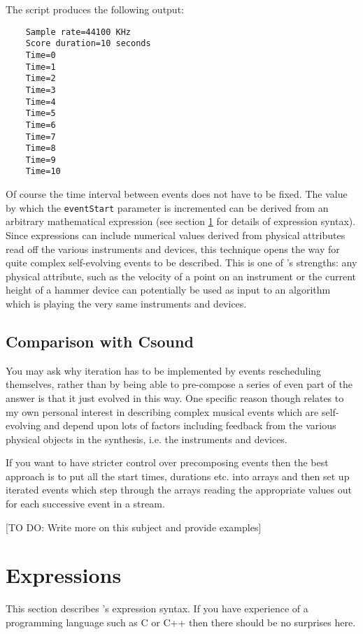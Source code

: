 The script produces the following output:

\begin{verbatim}
    Sample rate=44100 KHz
    Score duration=10 seconds
    Time=0
    Time=1
    Time=2
    Time=3
    Time=4
    Time=5
    Time=6
    Time=7
    Time=8
    Time=9
    Time=10
\end{verbatim}

Of course the time interval between events does not have to be fixed.
The value by which the \verb|eventStart| parameter is incremented
can be derived from an arbitrary mathematical expression (see
section \ref{section:expressions} for details of expression syntax).
Since expressions can include numerical values derived from physical
attributes read off the various instruments and devices, this technique
opens the way for quite complex self-evolving events to be described.
This is one of \tao's strengths: any physical attribute, such as the
velocity of a point on an instrument or the current height of a hammer
device can potentially be used as input to an algorithm which is playing
the very same instruments and devices.

\subsection{Comparison with Csound}
You may ask why iteration has to be implemented by events rescheduling
themselves, rather than by being able to pre-compose a series of even
part of the answer is that it just evolved in this way. One specific
reason though relates to my own personal interest in describing complex
musical events which are self-evolving and depend upon lots of factors
including feedback from the various physical objects in the synthesis,
i.e. the instruments and devices.

If you want to have stricter control over precomposing events
then the best approach is to put all the start times, durations etc.
into arrays and then set up iterated events which step through the
arrays reading the appropriate values out for each successive event
in a stream. 

[TO DO: Write more on this subject and provide examples]

\section{Expressions}
\label{section:expressions}
This section describes \tao's expression syntax. If you have
experience of a programming language such as C or C++ then there
should be no surprises here.

